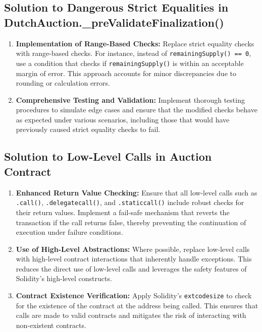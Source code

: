 \documentclass[conference]{IEEEtran}
\begin{document}

\subsection{Solution to Dangerous Strict Equalities in DutchAuction.\_preValidateFinalization()}

\begin{enumerate}
    \item \textbf{Implementation of Range-Based Checks:} Replace strict equality checks with range-based checks. For instance, instead of \texttt{remainingSupply() == 0}, use a condition that checks if \texttt{remainingSupply()} is within an acceptable margin of error. This approach accounts for minor discrepancies due to rounding or calculation errors.
    
    \item \textbf{Comprehensive Testing and Validation:} Implement thorough testing procedures to simulate edge cases and ensure that the modified checks behave as expected under various scenarios, including those that would have previously caused strict equality checks to fail.
\end{enumerate}

\subsection{Solution to Low-Level Calls in Auction Contract}
\begin{enumerate}
    \item \textbf{Enhanced Return Value Checking:} Ensure that all low-level calls such as \texttt{.call()}, \texttt{.delegatecall()}, and \texttt{.staticcall()} include robust checks for their return values. Implement a fail-safe mechanism that reverts the transaction if the call returns false, thereby preventing the continuation of execution under failure conditions.
    \item \textbf{Use of High-Level Abstractions:} Where possible, replace low-level calls with high-level contract interactions that inherently handle exceptions. This reduces the direct use of low-level calls and leverages the safety features of Solidity's high-level constructs.
    \item \textbf{Contract Existence Verification:} Apply Solidity's \texttt{extcodesize} to check for the existence of the contract at the address being called. This ensures that calls are made to valid contracts and mitigates the risk of interacting with non-existent contracts.
\end{enumerate}
\end{document}
